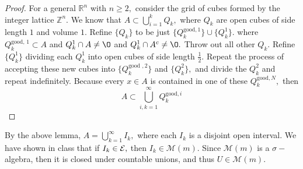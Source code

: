 \documentclass[11pt]{article}
\newcommand{\bbR}{\mathbb{R}}
\newcommand{\bbZ}{\mathbb{Z}}
\renewcommand{\emptyset}{\O}
\begin{document}
\begin{problem}
\begin{enumerate}
\begin{solution}
\begin{proof}
        For a general $\bbR^n$ with $n \geq 2,$ consider the grid of cubes formed by the integer lattice $\bbZ^n.$ We know that $A \subset \bigcup_{i=1}^k Q_k,$ where $Q_k$ are open cubes of side length $1$ and volume $1.$ Refine $\{Q_k\}$ to be just $\{Q^{\text{good}, 1}_k\} \cup \{Q_k^{\text{1}}\}.$ where $Q_k^\text{good, 1}\subset A$ and $Q_k^{{1}} \cap A \neq \emptyset$ and $Q_k^{1} \cap A^c \neq \emptyset.$ Throw out all other $Q_k.$ Refine $\{Q_k^1\}$ dividing each $Q_k^1$ into  open cubes of side length $\frac{1}{2}.$ Repeat the process of accepting these new cubes into $\{Q_k^{\text{good  }, 2}\}$ and $\{Q_k^2\},$ and divide the $Q_k^2$ and repeat indefinitely. Because every $x\in A$ is contained in one of these $Q_k^{\text{good}, N},$ then 
        \[A \subset \bigcup_{i, k=1}^\infty Q_k^{\text{good}, i}\]
            \end{proof}
            By the above lemma, $A = \bigcup_{k=1}^\infty I_k,$ where each $I_k$ is a disjoint open interval. 
            We have shown in class that if $I_k \in \cal E,$ then $I_k \in \mathcal{M}(m).$ Since $\mathcal{M}(m)$ is a $\sigma-$algebra, then it is closed under countable unions, and thus $U \in \mathcal{M}(m).$ 


\end{solution}
\end{enumerate}
\end{problem}
\end{document}
